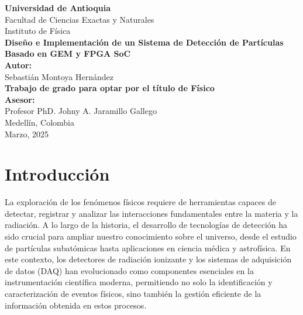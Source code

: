 \documentclass{report}
\begin{document}
\begin{titlepage}
    \centering
    {\LARGE \textbf{Universidad de Antioquia}}\\
    {\Large Facultad de Ciencias Exactas y Naturales}\\
    {\Large Instituto de Física}\\[3cm] %

    {\huge \textbf{Diseño e Implementación de un Sistema de Detección de Partículas Basado en GEM y FPGA SoC}}\\[2cm]

    \textbf{Autor:}\\
    {\Large Sebastián Montoya Hernández}\\[1cm]

    \textbf{Trabajo de grado para optar por el título de Físico}\\[1cm]

    \textbf{Asesor:}\\
    {\Large Profesor PhD. Johny A. Jaramillo Gallego}\\[2cm]

    {\Large Medellín, Colombia}\\
    {\Large Marzo, 2025} %

\end{titlepage}

\tableofcontents 
\newpage
\section*{Introducción}  

\noindent La exploración de los fenómenos físicos requiere de herramientas capaces de detectar, registrar y analizar las interacciones fundamentales entre la materia y la radiación. A lo largo de la historia, el desarrollo de tecnologías de detección ha sido crucial para ampliar nuestro conocimiento sobre el universo, desde el estudio de partículas subatómicas hasta aplicaciones en ciencia médica y astrofísica. En este contexto, los detectores de radiación ionizante y los sistemas de adquisición de datos (DAQ) han evolucionado como componentes esenciales en la instrumentación científica moderna, permitiendo no solo la identificación y caracterización de eventos físicos, sino también la gestión eficiente de la información obtenida en estos procesos.\\
\end{document}
